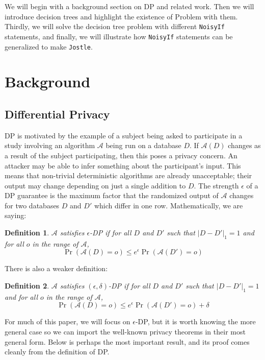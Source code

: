 \documentclass[11pt]{article}
\newtheorem{defn}{Definition}
\begin{document}
We will begin with a background section on DP and related work. Then we will introduce decision trees and highlight the existence of Problem with them. Thirdly, we will solve the decision tree problem with different \texttt{NoisyIf} statements, and finally, we will illustrate how \texttt{NoisyIf} statements can be generalized to make \texttt{Jostle}.

\section{Background}
\subsection{Differential Privacy}
DP is motivated by the example of a subject being asked to participate in a study involving an algorithm $\mathcal{A}$ being run on a database $D$. If $\mathcal{A}(D)$ changes as a result of the subject participating, then this poses a privacy concern. An attacker may be able to infer something about the participant's input. This means that non-trivial deterministic algorithms are already unacceptable; their output may change depending on just a single addition to $D$. The strength $\epsilon$ of a DP guarantee is the maximum factor that the randomized output of $\mathcal{A}$ changes for two databases $D$ and $D'$ which differ in one row. Mathematically, we are saying:

\begin{defn}
$\mathcal{A}$ satisfies $\epsilon$-DP if for all $D$ and $D'$ such that $|D-D'|_1=1$ and for all $o$ in the range of $\mathcal{A}$, 
\[\Pr\left(\mathcal{A}(D) = o \right) \leq e^{\epsilon} \Pr\left(\mathcal{A}(D')=o\right)\]
\end{defn}

There is also a weaker definition: 

\begin{defn}
$\mathcal{A}$ satisfies $(\epsilon, \delta)$-DP if for all $D$ and $D'$ such that $|D-D'|_1=1$ and for all $o$ in the range of $\mathcal{A}$, 
\[\Pr\left(\mathcal{A}(D) = o \right) \leq e^{\epsilon} \Pr\left(\mathcal{A}(D')=o \right) + \delta\]
\end{defn}

For much of this paper, we will focus on $\epsilon$-DP, but it is worth knowing the more general case so we can import the well-known privacy theorems in their most general form. Below is perhaps the most important result, and its proof comes cleanly from the definition of DP.
\end{document}
